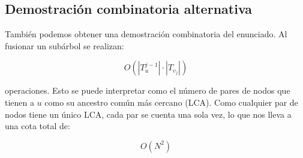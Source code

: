 \subsection{Demostración combinatoria alternativa}

También podemos obtener una demostración combinatoria del enunciado. Al fusionar un subárbol se realizan:

\[
O(|T_u^{j-1}| \cdot |T_{v_j}|)
\]

operaciones. Esto se puede interpretar como el número de pares de nodos que tienen a $u$ como su ancestro común más cercano (LCA).
Como cualquier par de nodos tiene un único LCA, cada par se cuenta una sola vez, lo que nos lleva a una cota total de:

\[
O(N^2)
\]

